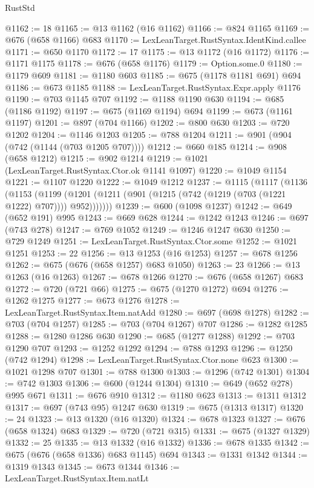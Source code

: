 \begin{lexlean}{RustStd}
\begin{coremodule}
@1162 := 18
@1165 := @13 @1162 (@16 @1162)
@1166 := @824 @1165
@1169 := @676 (@658 @1166) @683
@1170 := LexLeanTarget.RustSyntax.IdentKind.callee
@1171 := @650 @1170
@1172 := 17
@1175 := @13 @1172 (@16 @1172)
@1176 := @1171 @1175
@1178 := @676 (@658 @1176)
@1179 := Option.some.{0}
@1180 := @1179 @609
@1181 := @1180 @603
@1185 := @675 (@1178 @1181 @691) @694
@1186 := @673 @1185
@1188 := LexLeanTarget.RustSyntax.Expr.apply @1176
@1190 := @703 @1145 @707
@1192 := @1188 @1190 @630
@1194 := @685 (@1186 @1192)
@1197 := @675 (@1169 @1194) @694
@1199 := @673 (@1161 @1197)
@1201 := @897 (@704 @1166)
@1202 := @800 @630
@1203 := @720 @1202
@1204 := @1146 @1203
@1205 := @788 @1204
@1211 := @901 (@904 (@742 (@1144 (@703 @1205 @707))))
@1212 := @660 @185
@1214 := @908 (@658 @1212)
@1215 := @902 @1214
@1219 := @1021 (LexLeanTarget.RustSyntax.Ctor.ok @1141 @1097)
@1220 := @1049 @1154
@1221 := @1107 @1220
@1222 := @1049 @1212
@1237 := @1115
    (@1117
      (@1136
        (@1153
          (@1199 (@1201 (@1211 (@901 (@1215 (@742 (@1219 (@703 (@1221 @1222) @707)))) @952)))))))
@1239 := @600 (@1098 @1237)
@1242 := @649 (@652 @191) @995
@1243 := @669 @628
@1244 := @1242 @1243
@1246 := @697 (@743 @278)
@1247 := @769 @1052
@1249 := @1246 @1247 @630
@1250 := @729 @1249
@1251 := LexLeanTarget.RustSyntax.Ctor.some
@1252 := @1021 @1251
@1253 := 22
@1256 := @13 @1253 (@16 @1253)
@1257 := @678 @1256
@1262 := @675 (@676 (@658 @1257) @683 @1050)
@1263 := 23
@1266 := @13 @1263 (@16 @1263)
@1267 := @678 @1266
@1270 := @676 (@658 @1267) @683
@1272 := @720 (@721 @66)
@1275 := @675 (@1270 @1272) @694
@1276 := @1262 @1275
@1277 := @673 @1276
@1278 := LexLeanTarget.RustSyntax.Item.natAdd
@1280 := @697 (@698 @1278)
@1282 := @703 (@704 @1257)
@1285 := @703 (@704 @1267) @707
@1286 := @1282 @1285
@1288 := @1280 @1286 @630
@1290 := @685 (@1277 @1288)
@1292 := @703 @1290 @707
@1293 := @1252 @1292
@1294 := @788 @1293
@1296 := @1250 (@742 @1294)
@1298 := LexLeanTarget.RustSyntax.Ctor.none @623
@1300 := @1021 @1298 @707
@1301 := @788 @1300
@1303 := @1296 (@742 @1301)
@1304 := @742 @1303
@1306 := @600 (@1244 @1304)
@1310 := @649 (@652 @278) @995 @671
@1311 := @676 @910
@1312 := @1180 @623
@1313 := @1311 @1312
@1317 := @697 (@743 @95) @1247 @630
@1319 := @675 (@1313 @1317)
@1320 := 24
@1323 := @13 @1320 (@16 @1320)
@1324 := @678 @1323
@1327 := @676 (@658 @1324) @683
@1329 := @720 (@721 @315)
@1331 := @675 (@1327 @1329)
@1332 := 25
@1335 := @13 @1332 (@16 @1332)
@1336 := @678 @1335
@1342 := @675 (@676 (@658 @1336) @683 @1145) @694
@1343 := @1331 @1342
@1344 := @1319 @1343
@1345 := @673 @1344
@1346 := LexLeanTarget.RustSyntax.Item.natLt

\end{coremodule}
\end{lexlean}
